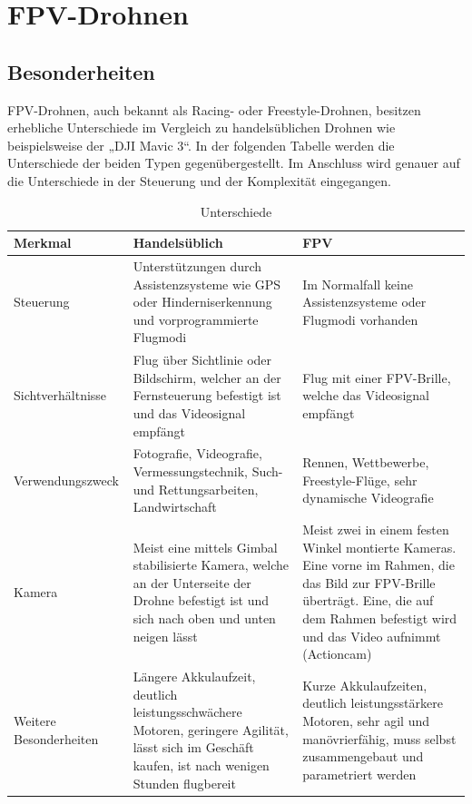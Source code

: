 
\section[FPV-Drohnen]{FPV-Drohnen}
    \subsection[Besonderheiten]{Besonderheiten}
        FPV-Drohnen, auch bekannt als Racing- oder Freestyle-Drohnen, besitzen erhebliche Unterschiede im Vergleich zu handelsüblichen Drohnen wie beispielsweise der „DJI Mavic 3“. In der folgenden Tabelle werden die Unterschiede der beiden Typen gegenübergestellt. Im Anschluss wird genauer auf die Unterschiede in der Steuerung und der Komplexität eingegangen.

        \begin{table}[h]
            \renewcommand{\arraystretch}{1.5}
            \begin{tabular}{p{3cm}p{5.86cm}p{5.86cm}}
                \toprule
                \textbf{Merkmal} & \textbf{Handelsüblich} & \textbf{FPV} \\
                \midrule
                Steuerung               & Unterstützungen durch Assistenzsysteme wie GPS oder Hinderniserkennung und vorprogrammierte Flugmodi                                                  & Im Normalfall keine Assistenzsysteme oder Flugmodi vorhanden \\
                Sichtverhältnisse       & Flug über Sichtlinie oder Bildschirm, welcher an der Fernsteuerung befestigt ist und das Videosignal empfängt                                         & Flug mit einer FPV-Brille, welche das Videosignal empfängt \\
                Verwendungszweck        & Fotografie, Videografie, Vermessungstechnik, Such- und Rettungsarbeiten, Landwirtschaft                                                               & Rennen, Wettbewerbe, Freestyle-Flüge, sehr dynamische Videografie \\
                Kamera                  & Meist eine mittels Gimbal stabilisierte Kamera, welche an der Unterseite der Drohne befestigt ist und sich nach oben und unten neigen lässt           & Meist zwei in einem festen Winkel montierte Kameras. Eine vorne im Rahmen, die das Bild zur FPV-Brille überträgt. Eine, die auf dem Rahmen befestigt wird und das Video aufnimmt (Actioncam) \\
                Weitere Besonderheiten  & Längere Akkulaufzeit, deutlich leistungsschwächere Motoren, geringere Agilität, lässt sich im Geschäft kaufen, ist nach wenigen Stunden flugbereit    & Kurze Akkulaufzeiten, deutlich leistungsstärkere Motoren, sehr agil und manövrierfähig, muss selbst zusammengebaut und parametriert werden \\
                \bottomrule
            \end{tabular}
            \caption{Unterschiede}
            \label{tabelle_unterschiede}
        \end{table}

